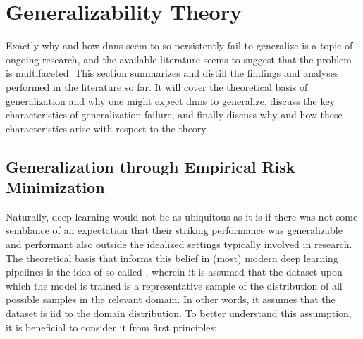 \section{Generalizability Theory} \label{gen_theory}
	Exactly why and how \glspl{dnn} seem to so persistently fail to generalize is a topic of ongoing research, and the available literature seems to suggest that the problem is multifaceted. This section summarizes and distill the findings and analyses performed in the literature so far. It will cover the theoretical basis of generalization and why one might expect \glspl{dnn} to generalize, discuss the key characteristics of generalization failure, and finally discuss why and how these characteristics arise with respect to the theory.
	
	\subsection{Generalization through Empirical Risk Minimization} 
		Naturally, deep learning would not be as ubiquitous as it is if there was not some semblance of an expectation that their striking performance was generalizable and performant also outside the idealized settings typically involved in research. The theoretical basis that informs this belief in (most) modern deep learning pipelines is the idea of so-called , wherein it is assumed that the dataset upon which the model is trained is a representative sample of the distribution of all possible samples in the relevant domain. In other words, it assumes that the dataset is \gls{iid} to the domain distribution. To better understand this assumption, it is beneficial to consider it from first principles: 
		
